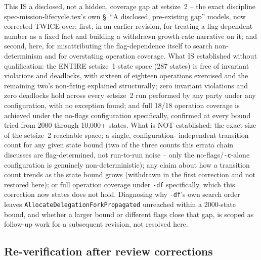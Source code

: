 \documentclass[a4paper,10pt,fleqn]{article}
\newcommand{\field}[1]{\texttt{#1}}
\begin{document}
This IS a disclosed, not a hidden, coverage gap at setsize~2 -- the
exact discipline spec-mission-lifecycle.tex's own
\S~``A disclosed, pre-existing gap'' models, now corrected TWICE over:
first, in an earlier revision, for treating a flag-dependent number as
a fixed fact and building a withdrawn growth-rate narrative on it; and
second, here, for misattributing the flag-dependence itself to search
non-determinism and for overstating operation coverage. What IS
established without
qualification: the ENTIRE setsize~1 state space (287 states) is free of
invariant violations and deadlocks, with sixteen of eighteen operations
exercised and the remaining two's non-firing explained structurally;
zero invariant violations and zero deadlocks hold across every
setsize~2 run performed by any party under any configuration, with no
exception found; and full 18/18 operation coverage is achieved under
the no-flags configuration specifically, confirmed at every bound
tried from 2000 through 10,000+ states. What is NOT established: the
exact size of the setsize~2 reachable space; a single, configuration-
independent transition count for any given state bound (two of the
three counts this errata chain discusses are flag-determined, not
run-to-run noise -- only the no-flags/\texttt{-c}-alone configuration
is genuinely non-deterministic); any claim about how a transition count
trends as the state bound grows (withdrawn in the first correction and
not restored here); or full operation coverage under \texttt{-df}
specifically, which this correction now states does not hold.
Diagnosing why \texttt{-df}'s own search order leaves
\field{AllocateDelegationForkPropagated} unreached within a 2000-state
bound, and whether a larger bound or different flags close that gap,
is scoped as follow-up work for a subsequent revision, not resolved
here.

\subsection{Re-verification after review corrections}
\end{document}
